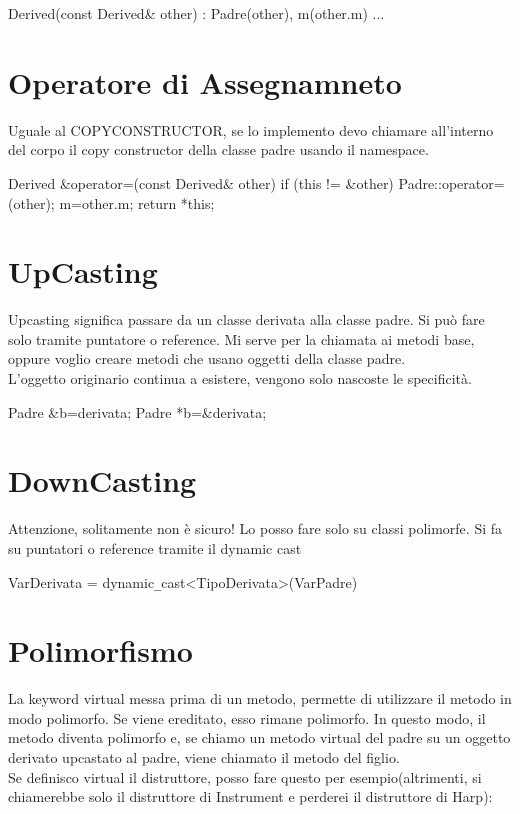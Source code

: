 \begin{cpp}
Derived(const Derived& other) : Padre(other), m(other.m) {...}
\end{cpp}

\section{Operatore di Assegnamneto}
Uguale al COPYCONSTRUCTOR, se lo implemento devo chiamare all'interno del corpo il copy constructor della classe padre usando il namespace.

\begin{cpp}
Derived &operator=(const Derived& other) {
	if (this != &other) {
		Padre::operator=(other);
		m=other.m;
	}
	return *this;
}
\end{cpp}

\section{UpCasting}
Upcasting significa passare da un classe derivata alla classe padre. Si può fare solo tramite puntatore o reference. Mi serve per la chiamata ai metodi base, oppure voglio creare metodi che usano oggetti della classe padre.\\
L'oggetto originario continua a esistere, vengono solo nascoste le specificità.

\begin{cpp}
Padre &b=derivata;
Padre *b=&derivata;
\end{cpp}

\section{DownCasting}
Attenzione, solitamente non è sicuro! Lo posso fare solo su classi polimorfe. Si fa su puntatori o reference tramite il dynamic cast\\

\begin{tcolorbox}
VarDerivata = dynamic\verb|_|cast<TipoDerivata>(VarPadre)
\end{tcolorbox}

\section{Polimorfismo}
La keyword virtual messa prima di un metodo, permette di utilizzare il metodo in modo polimorfo. Se viene ereditato, esso rimane polimorfo.
In questo modo, il metodo diventa polimorfo e, se chiamo un metodo virtual del padre su un oggetto derivato upcastato al padre, viene chiamato il metodo del figlio.\\
Se definisco virtual il distruttore, posso fare questo per esempio(altrimenti, si chiamerebbe solo il distruttore di Instrument e perderei il distruttore di Harp):

